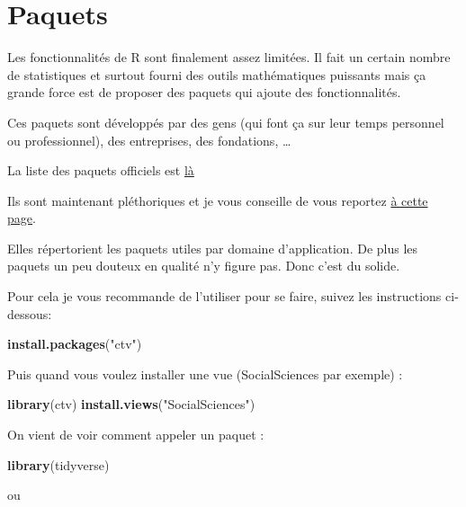 \documentclass[
]{book}
\newenvironment{Shaded}{\begin{snugshade}}{\end{snugshade}}
\newcommand{\FunctionTok}[1]{\textcolor[rgb]{0.13,0.29,0.53}{\textbf{#1}}}
\newcommand{\NormalTok}[1]{#1}
\newcommand{\StringTok}[1]{\textcolor[rgb]{0.31,0.60,0.02}{#1}}
\begin{document}
\section{Paquets}\label{paquets}

Les fonctionnalités de R sont finalement assez limitées. Il fait un certain
nombre de statistiques et surtout fourni des outils mathématiques puissants
mais ça grande force est de proposer des paquets qui ajoute des fonctionnalités.

Ces paquets sont développés par des gens (qui font ça sur leur temps personnel
ou professionnel), des entreprises, des fondations, \ldots{}

La liste des paquets officiels est \href{https://cran.r-project.org/web/packages/available_packages_by_name.html}{là}

Ils sont maintenant pléthoriques et je vous conseille de vous reportez \href{https://cran.r-project.org/web/views/}{à cette page}.

Elles répertorient les paquets utiles par domaine d'application. De plus les
paquets un peu douteux en qualité n'y figure pas. Donc c'est du solide.

Pour cela je vous recommande de l'utiliser pour se faire, suivez les instructions ci-dessous:

\begin{Shaded}
\begin{Highlighting}[]
\FunctionTok{install.packages}\NormalTok{(}\StringTok{"ctv"}\NormalTok{)}
\end{Highlighting}
\end{Shaded}

Puis quand vous voulez installer une vue (SocialSciences par exemple) :

\begin{Shaded}
\begin{Highlighting}[]
\FunctionTok{library}\NormalTok{(ctv)}
\FunctionTok{install.views}\NormalTok{(}\StringTok{"SocialSciences"}\NormalTok{)}
\end{Highlighting}
\end{Shaded}

On vient de voir comment appeler un paquet :

\begin{Shaded}
\begin{Highlighting}[]
\FunctionTok{library}\NormalTok{(tidyverse)}
\end{Highlighting}
\end{Shaded}

ou
\end{document}
